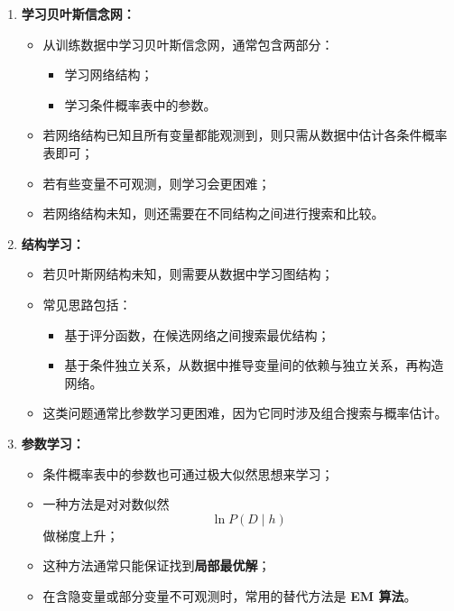 \documentclass[../main.tex]{subfiles}
\begin{document}
\begin{enumerate}
    \item \textbf{学习贝叶斯信念网：}
    \begin{itemize}
        \item 从训练数据中学习贝叶斯信念网，通常包含两部分：
        \begin{itemize}
            \item 学习网络结构；
            \item 学习条件概率表中的参数。
        \end{itemize}
        \item 若网络结构已知且所有变量都能观测到，则只需从数据中估计各条件概率表即可；
        \item 若有些变量不可观测，则学习会更困难；
        \item 若网络结构未知，则还需要在不同结构之间进行搜索和比较。
    \end{itemize}

     \item \textbf{结构学习：}
        \begin{itemize}
            \item 若贝叶斯网结构未知，则需要从数据中学习图结构；
            \item 常见思路包括：
            \begin{itemize}
                \item 基于评分函数，在候选网络之间搜索最优结构；
                \item 基于条件独立关系，从数据中推导变量间的依赖与独立关系，再构造网络。
            \end{itemize}
            \item 这类问题通常比参数学习更困难，因为它同时涉及组合搜索与概率估计。
        \end{itemize}
    
    \item \textbf{参数学习：}
    \begin{itemize}
        \item 条件概率表中的参数也可通过极大似然思想来学习；
        \item 一种方法是对对数似然
        $$
        \ln P(D\mid h)
        $$
        做梯度上升；
        \item 这种方法通常只能保证找到\textbf{局部最优解}；
        \item 在含隐变量或部分变量不可观测时，常用的替代方法是 \textbf{EM 算法}。
    \end{itemize}
\end{enumerate}
\end{document}

